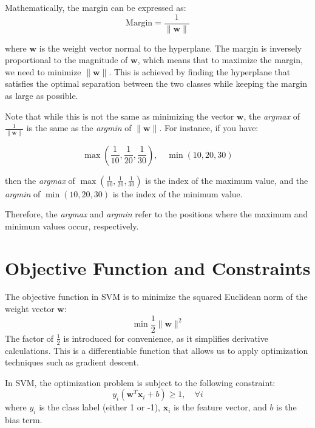 Mathematically, the margin can be expressed as:
\[
\text{Margin} = \frac{1}{\| \mathbf{w} \|}
\]

where \( \mathbf{w} \) is the weight vector normal to the hyperplane. The margin is inversely proportional to the magnitude of \( \mathbf{w} \), which means that to maximize the margin, we need to minimize \( \| \mathbf{w} \| \). This is achieved by finding the hyperplane that satisfies the optimal separation between the two classes while keeping the margin as large as possible. 

Note that while this is not the same as minimizing the vector \( \mathbf{w} \), the \textit{argmax} of \( \frac{1}{\| \mathbf{w} \|} \) is the same as the \textit{argmin} of \( \| \mathbf{w} \| \). For instance, if you have:

\[
\max(\frac{1}{10}, \frac{1}{20}, \frac{1}{30}), \quad \min(10, 20, 30)
\]

then the \textit{argmax} of \( \max(\frac{1}{10}, \frac{1}{20}, \frac{1}{30}) \) is the index of the maximum value, and the \textit{argmin} of \( \min(10, 20, 30) \) is the index of the minimum value. 

Therefore, the \textit{argmax} and \textit{argmin} refer to the positions where the maximum and minimum values occur, respectively.

\section{Objective Function and Constraints}

The objective function in SVM is to minimize the squared Euclidean norm of the weight vector \( \mathbf{w} \):
\[
\min \frac{1}{2} \| \mathbf{w} \|^2
\]
The factor of \( \frac{1}{2} \) is introduced for convenience, as it simplifies derivative calculations. This is a differentiable function that allows us to apply optimization techniques such as gradient descent.

In SVM, the optimization problem is subject to the following constraint:
\[
y_i (\mathbf{w}^T \mathbf{x}_i + b) \geq 1, \quad \forall i
\]
where \( y_i \) is the class label (either 1 or -1), \( \mathbf{x}_i \) is the feature vector, and \( b \) is the bias term.

